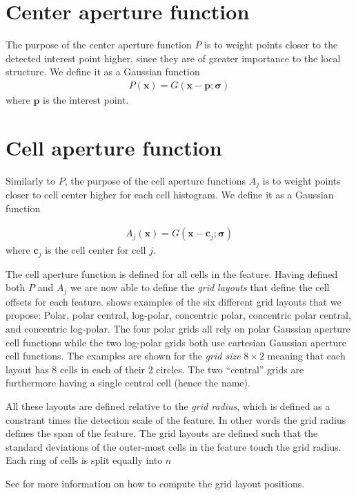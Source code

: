 \documentclass[thesis.tex]{subfiles}
\def\x{\mathbf{x}}
\def\p{\mathbf{p}}
\def\c{\mathbf{c}}
\begin{document}
\section{Center aperture function}
%
The purpose of the center aperture function $P$ is to weight points closer to the detected interest point higher, since they are of greater importance to the local structure. We define it as a Gaussian function
%
\begin{align}
P(\x) = G(\x - \p; \boldsymbol{\sigma})
\end{align}
%
where $\p$ is the interest point.
%
\section{Cell aperture function}
%
Similarly to $P$, the purpose of the cell aperture functions $A_j$ is to weight points closer to cell center higher for each cell histogram. We define it as a Gaussian function

%
\begin{align}
A_j(\x) = G(\x - \c_j; \boldsymbol{\sigma})
\end{align}
%
where $\c_j$ is the cell center for cell $j$.

The cell aperture function is defined for all cells in the feature. Having defined both $P$ and $A_j$ we are now able to define the \emph{grid layouts} that define the cell offsets for each feature.
 shows examples of the six different grid layouts that we propose: Polar, polar central, log-polar, concentric polar, concentric polar central, and concentric log-polar. The four polar grids all rely on polar Gaussian aperture cell functions while the two log-polar grids both use cartesian Gaussian aperture cell functions. The examples are shown for the \emph{grid size} $8\times 2$ meaning that each layout has 8 cells in each of their 2 circles. The two ``central'' grids are furthermore having a single central cell (hence the name).

All these layouts are defined relative to the \emph{grid radius}, which is defined as a constrant times the detection scale of the feature. In other words the grid radius defines the span of the feature. The grid layouts are defined such that the standard deviations of the outer-most cells in the feature touch the grid radius. Each ring of cells is split equally into $n$

See  for more information on how to compute the grid layout positions.
\end{document}
